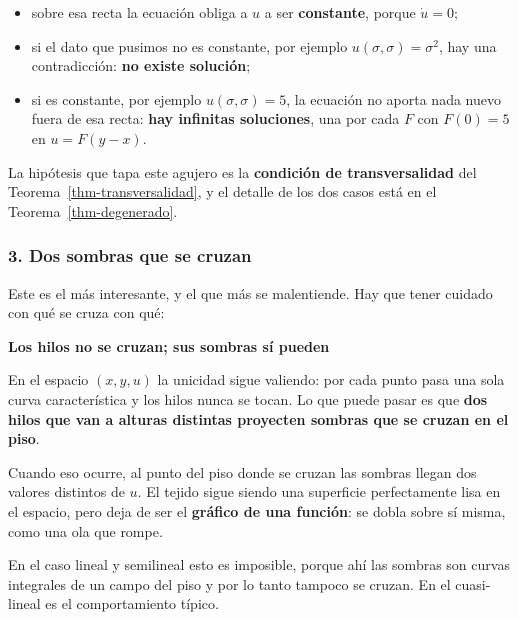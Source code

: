 \documentclass[
  spanish,
  a4paper,
]{scrbook}
\providecommand{\tightlist}{%
  \setlength{\itemsep}{0pt}\setlength{\parskip}{0pt}}
\theoremstyle{definition}
\theoremstyle{plain}
\theoremstyle{definition}
\theoremstyle{plain}
\theoremstyle{definition}
\theoremstyle{remark}
\begin{document}
\begin{itemize}
\tightlist
\item
  sobre esa recta la ecuación obliga a \(u\) a ser \textbf{constante},
  porque \(\dot u = 0\);
\item
  si el dato que pusimos no es constante, por ejemplo
  \(u(\sigma,\sigma) = \sigma^2\), hay una contradicción: \textbf{no
  existe solución};
\item
  si es constante, por ejemplo \(u(\sigma,\sigma)=5\), la ecuación no
  aporta nada nuevo fuera de esa recta: \textbf{hay infinitas
  soluciones}, una por cada \(F\) con \(F(0)=5\) en \(u = F(y-x)\).
\end{itemize}

La hipótesis que tapa este agujero es la \textbf{condición de
transversalidad} del Teorema~\ref{thm-transversalidad}, y el detalle de
los dos casos está en el Teorema~\ref{thm-degenerado}.

\subsubsection{3. Dos sombras que se cruzan}\label{sec-patologia-choque}

Este es el más interesante, y el que más se malentiende. Hay que tener
cuidado con qué se cruza con qué:

\begin{tcolorbox}[enhanced jigsaw, arc=.35mm, bottomrule=.15mm, breakable, colback=white, colframe=quarto-callout-important-color-frame, left=2mm, leftrule=.75mm, opacityback=0, rightrule=.15mm, toprule=.15mm]
\begin{minipage}[t]{5.5mm}
\textcolor{quarto-callout-important-color}{\faExclamation}
\end{minipage}%
\begin{minipage}[t]{\textwidth - 5.5mm}

\vspace{-3mm}\textbf{Los hilos no se cruzan; sus sombras sí pueden}\vspace{3mm}

En el espacio \((x,y,u)\) la unicidad sigue valiendo: por cada punto
pasa una sola curva característica y los hilos nunca se tocan. Lo que
puede pasar es que \textbf{dos hilos que van a alturas distintas
proyecten sombras que se cruzan en el piso}.

Cuando eso ocurre, al punto del piso donde se cruzan las sombras llegan
dos valores distintos de \(u\). El tejido sigue siendo una superficie
perfectamente lisa en el espacio, pero deja de ser el \textbf{gráfico de
una función}: se dobla sobre sí misma, como una ola que rompe.

En el caso lineal y semilineal esto es imposible, porque ahí las sombras
son curvas integrales de un campo del piso y por lo tanto tampoco se
cruzan. En el cuasi-lineal es el comportamiento típico.

\end{minipage}%
\end{tcolorbox}
\end{document}
